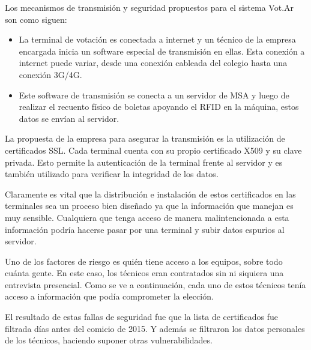 Los mecanismos de transmisión y seguridad propuestos para el sistema Vot.Ar son como siguen\cite{votar}:
\begin{itemize}
	\item La terminal de votación es conectada a internet y un técnico de la empresa encargada inicia un software especial de transmisión en ellas. Esta conexión a internet puede variar, desde una conexión cableada del colegio hasta una conexión 3G/4G.
	\item Este software de transmisión se conecta a un servidor de MSA y luego de realizar el recuento físico de boletas apoyando el RFID en la máquina, estos datos se envían al servidor.
\end{itemize}

La propuesta de la empresa para asegurar la transmisión es la utilización de certificados SSL. Cada terminal cuenta con su propio certificado X509 y su clave privada. Esto permite la autenticación de la terminal frente al servidor y es también utilizado para verificar la integridad de los datos.

Claramente es vital que la distribución e instalación de estos certificados en las terminales sea un proceso bien diseñado ya que la información que manejan es muy sensible. Cualquiera que tenga acceso de manera malintencionada a esta información podría hacerse pasar por una terminal y subir datos espurios al servidor.

Uno de los factores de riesgo es quién tiene acceso a los equipos, sobre todo cuánta gente. En este caso, los técnicos eran contratados sin ni siquiera una entrevista presencial. Como se ve a continuación, cada uno de estos técnicos tenía acceso a información que podía comprometer la elección\cite{smaldone}.

El resultado de estas fallas de seguridad fue que la lista de certificados fue filtrada días antes del comicio de 2015. Y además se filtraron los datos personales de los técnicos, haciendo suponer otras vulnerabilidades.

